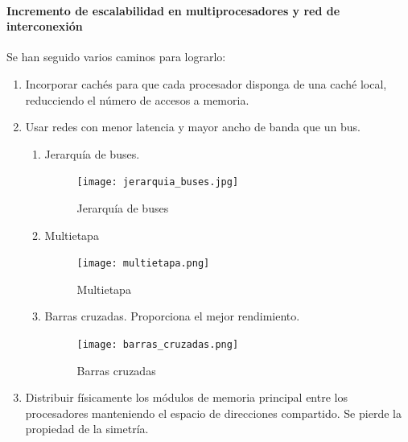 \documentclass[12pt,spanish]{article}
\begin{document}
\paragraph{Incremento de escalabilidad en multiprocesadores y red de interconexión}
Se han seguido varios caminos para lograrlo:
\begin{enumerate}
\item Incorporar cachés para que cada procesador disponga de una caché local, reducciendo el número de accesos a memoria.
\newpage
\item Usar redes con menor latencia y mayor ancho de banda que un bus.
\begin{enumerate}
\item Jerarquía de buses.
	\begin{figure}[H]
	\centering
	\texttt{[image: jerarquia\_buses.jpg]}
	\caption{Jerarquía de buses}
	\end{figure}
\item Multietapa
	\begin{figure}[H]
	\centering
	\texttt{[image: multietapa.png]}
	\caption{Multietapa}
	\end{figure}
\item Barras cruzadas. Proporciona el mejor rendimiento.
	\begin{figure}[H]
	\centering
	\texttt{[image: barras\_cruzadas.png]}
	\caption{Barras cruzadas}
	\end{figure}
\end{enumerate}
\item Distribuir físicamente los módulos de memoria principal entre los procesadores manteniendo el espacio de direcciones compartido. Se pierde la propiedad de la simetría.

\end{enumerate}
\end{document}

